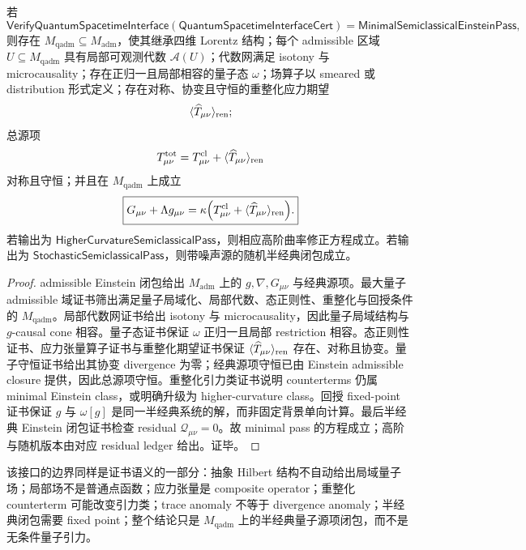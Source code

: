 \begin{theorem}[量子--时空半经典闭包的可靠性]\label{thm:typed-address-biaxial-completion-quantum-spacetime-semiclassical-closure-soundness}
若
\[
\mathsf{VerifyQuantumSpacetimeInterface}
(\mathsf{QuantumSpacetimeInterfaceCert})
=
\mathsf{MinimalSemiclassicalEinsteinPass},
\]
则存在 \(M_{\mathrm{qadm}}\subseteq M_{\mathrm{adm}}\)，使其继承四维 Lorentz 结构；每个 admissible 区域 \(U\subseteq M_{\mathrm{qadm}}\) 具有局部可观测代数 \(\mathcal A(U)\)；代数网满足 isotony 与 microcausality；存在正归一且局部相容的量子态 \(\omega\)；场算子以 smeared 或 distribution 形式定义；存在对称、协变且守恒的重整化应力期望
\[
\langle\widehat T_{\mu\nu}\rangle_{\rm ren};
\]
总源项
\[
T^{\rm tot}_{\mu\nu}
=
T^{\rm cl}_{\mu\nu}
+
\langle\widehat T_{\mu\nu}\rangle_{\rm ren}
\]
对称且守恒；并且在 \(M_{\mathrm{qadm}}\) 上成立
\[
\boxed{
G_{\mu\nu}
+
\Lambda g_{\mu\nu}
=
\kappa
\Bigl(
T^{\rm cl}_{\mu\nu}
+
\langle\widehat T_{\mu\nu}\rangle_{\rm ren}
\Bigr).
}
\]
若输出为 \(\mathsf{HigherCurvatureSemiclassicalPass}\)，则相应高阶曲率修正方程成立。若输出为 \(\mathsf{StochasticSemiclassicalPass}\)，则带噪声源的随机半经典闭包成立。
\end{theorem}
\begin{proof}
admissible Einstein 闭包给出 \(M_{\mathrm{adm}}\) 上的 \(g,\nabla,G_{\mu\nu}\) 与经典源项。最大量子 admissible 域证书筛出满足量子局域化、局部代数、态正则性、重整化与回授条件的 \(M_{\mathrm{qadm}}\)。局部代数网证书给出 isotony 与 microcausality，因此量子局域结构与 \(g\)-causal cone 相容。量子态证书保证 \(\omega\) 正归一且局部 restriction 相容。态正则性证书、应力张量算子证书与重整化期望证书保证 \(\langle\widehat T_{\mu\nu}\rangle_{\rm ren}\) 存在、对称且协变。量子守恒证书给出其协变 divergence 为零；经典源项守恒已由 Einstein admissible closure 提供，因此总源项守恒。重整化引力类证书说明 counterterms 仍属 minimal Einstein class，或明确升级为 higher-curvature class。回授 fixed-point 证书保证 \(g\) 与 \(\omega[g]\) 是同一半经典系统的解，而非固定背景单向计算。最后半经典 Einstein 闭包证书检查 residual \(\mathcal Q_{\mu\nu}=0\)。故 minimal pass 的方程成立；高阶与随机版本由对应 residual ledger 给出。证毕。
\end{proof}

该接口的边界同样是证书语义的一部分：抽象 Hilbert 结构不自动给出局域量子场；局部场不是普通点函数；应力张量是 composite operator；重整化 counterterm 可能改变引力类；trace anomaly 不等于 divergence anomaly；半经典闭包需要 fixed point；整个结论只是 \(M_{\mathrm{qadm}}\) 上的半经典量子源项闭包，而不是无条件量子引力。
